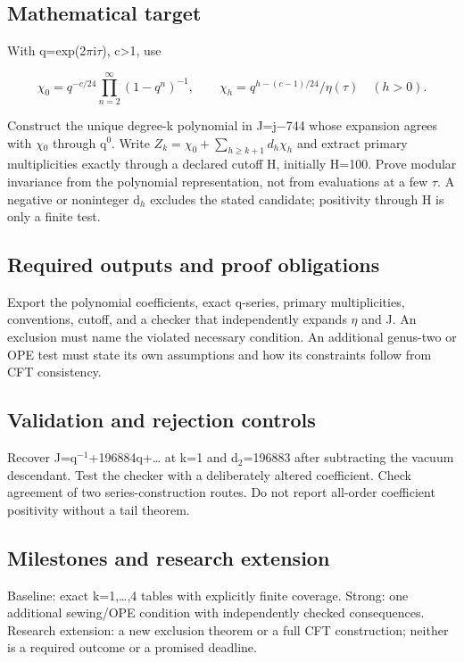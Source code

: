 \documentclass[
  11pt,
]{article}
\begin{document}
\subsection{Mathematical target}

With q=exp(2\ensuremath{\pi}i\ensuremath{\tau}), c\textgreater1, use

\[\chi _0=q^{-c/24}\prod_{n=2}^{\infty }(1-q^n)^{-1},\qquad \chi _h=q^{h-(c-1)/24}/\eta (\tau )\quad(h>0).\]

Construct the unique degree-k polynomial in J=j\ensuremath{-}744 whose
expansion agrees with \ensuremath{\chi}\ensuremath{{}_{0}} through
q\ensuremath{{}^{0}}. Write \(Z_k=\chi_0+\sum_{h\ge k+1}d_h\chi_h\) and
extract primary multiplicities exactly through a declared cutoff H,
initially H=100. Prove modular invariance from the polynomial
representation, not from evaluations at a few \ensuremath{\tau}. A
negative or noninteger d\ensuremath{{}_{h}} excludes the stated
candidate; positivity through H is only a finite test.

\subsection{Required outputs and proof obligations}

Export the polynomial coefficients, exact q-series, primary
multiplicities, conventions, cutoff, and a checker that independently
expands \ensuremath{\eta} and J. An exclusion must name the violated
necessary condition. An additional genus-two or OPE test must state its
own assumptions and how its constraints follow from CFT consistency.

\subsection{Validation and rejection controls}

Recover J=q\ensuremath{{}^{-1}}+196884q+… at k=1 and
d\ensuremath{{}_{2}}=196883 after subtracting the vacuum descendant.
Test the checker with a deliberately altered coefficient. Check
agreement of two series-construction routes. Do not report all-order
coefficient positivity without a tail theorem.

\subsection{Milestones and research extension}

Baseline: exact k=1,\ldots,4 tables with explicitly finite coverage.
Strong: one additional sewing/OPE condition with independently checked
consequences. Research extension: a new exclusion theorem or a full CFT
construction; neither is a required outcome or a promised deadline.
\end{document}
